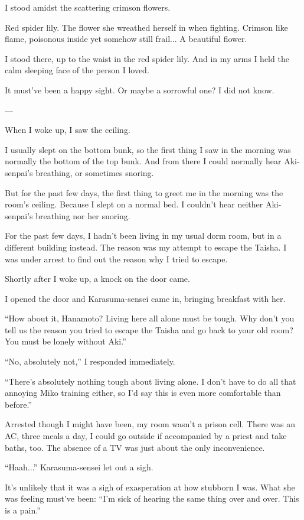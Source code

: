 
I stood amidst the scattering crimson flowers.

Red spider lily. The flower she wreathed herself in when fighting. Crimson like flame, poisonous inside yet somehow still frail... A beautiful flower.

I stood there, up to the waist in the red spider lily. And in my arms I held the calm sleeping face of the person I loved.

It must've been a happy sight. Or maybe a sorrowful one? I did not know.

---

When I woke up, I saw the ceiling.

I usually slept on the bottom bunk, so the first thing I saw in the morning was normally the bottom of the top bunk. And from there I could normally hear Aki-senpai's breathing, or sometimes snoring.

But for the past few days, the first thing to greet me in the morning was the room's ceiling. Because I slept on a normal bed. I couldn't hear neither Aki-senpai's breathing nor her snoring.

For the past few days, I hadn't been living in my usual dorm room, but in a different building instead. The reason was my attempt to escape the Taisha. I was under arrest to find out the reason why I tried to escape.

Shortly after I woke up, a knock on the door came.

I opened the door and Karasuma-sensei came in, bringing breakfast with her.

``How about it, Hanamoto? Living here all alone must be tough. Why don't you tell us the reason you tried to escape the Taisha and go back to your old room? You must be lonely without Aki.''

``No, absolutely not,'' I responded immediately.

``There's absolutely nothing tough about living alone. I don't have to do all that annoying Miko training either, so I'd say this is even more comfortable than before.''

Arrested though I might have been, my room wasn't a prison cell. There was an AC, three meals a day, I could go outside if accompanied by a priest and take baths, too. The absence of a TV was just about the only inconvenience.

``Haah...'' Karasuma-sensei let out a sigh.

It's unlikely that it was a sigh of exasperation at how stubborn I was. What she was feeling must've been: ``I'm sick of hearing the same thing over and over. This is a pain.''

